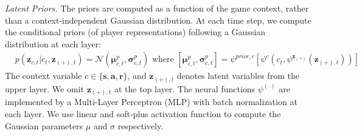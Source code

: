\documentclass{article}
\newcommand{\context}{c}
\newcommand{\latentvariables}{\mathbf{z}}
\newcommand{\state}{\mathbf{s}}
\newcommand{\action}{\mathbf{a}}
\newcommand{\reward}{\boldsymbol{r}}
\begin{document}
{\em Latent Priors.}  The priors are computed as a function of the game context, rather than a context-independent Gaussian distribution. At each time step, we compute the conditional priors (of player representations) following a Gaussian distribution at each layer:
\begin{align} \label{eq:ladder}
    & p(\latentvariables_{\context,t}|\context_{t},\latentvariables_{(+),t})=\mathcal{N}(\boldsymbol{\mu}^{p}_{\context,t},\boldsymbol{\sigma}^{p}_{\context,t}) \text{ where } [\boldsymbol{\mu}^{p}_{\context,t},\boldsymbol{\sigma}^{p}_{\context,t}]=\psi^{prior,\context}[\psi^{\context}(\context_{t}, \psi^{\latentvariables_(+)}(\latentvariables_{(+),t}))]
\end{align}
The context variable $\context\in\{\state,\action,\reward\}$, and $\latentvariables_{(+),t}$ denotes latent variables from the upper layer. We omit $\latentvariables_{(+),t}$ at the top layer.
The neural functions $\psi^{(\cdot)}$ are implemented by a Multi-Layer Perceptron (MLP) with batch normalization at each layer.
We use linear and soft-plus activation function to compute the Gaussian parameters $\mu$ and $\sigma$ respectively.
\end{document}
